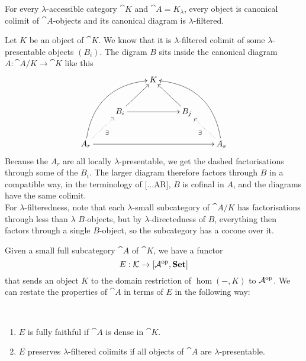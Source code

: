 \begin{Proposition}\label{prop:presdense}
For every $\lambda$-accessible category $\cat K$ and $\cat A = K_\lambda$, every object is canonical colimit of $\cat A$-objects and its canonical diagram is $\lambda$-filtered.
\end{Proposition}
\begin{Proof}
Let $K$ be an object of $\cat K$. We know that it is $\lambda$-filtered colimit of some $\lambda$-presentable objects $(B_i)$. The digram $B$ sits inside the canonical diagram $A : \cat A/K \to \cat K$ like this
\[
\xymatrix{
  & & K & & \\
& B_i \ar[rr] \ar[ru] & & B_j \ar[lu] & \\
A_r \ar[rrrr] \ar@/^2pc/[rruu] \ar@{.>}[ru]_{\exists} & & & & A_s \ar@{.>}[lu]^{\exists} \ar@/_2pc/[lluu]
}\]
Because the $A_r$ are all locally $\lambda$-presentable, we get the dashed factorisations through some of the $B_i$. The larger diagram therefore factors through $B$ in a compatible way, in the terminology of [...AR], $B$ is cofinal in $A$, and the diagrams have the same colimit. \\

For $\lambda$-filteredness, note that each $\lambda$-small subcategory of $\cat A/K$ has factorisations through less than $\lambda$ $B$-objects, but by $\lambda$-directedness of $B$, everything then factors through a single $B$-object, so the subcategory has a cocone over it. 
\end{Proof}


Given a small full subcategory $\cat A$ of $\cat K$, we have a functor 
\[ E : \mathcal{K} \to [\mathcal{A}^{\textrm{op}},\mathbf{Set}] \]
that sends an object $K$ to the domain restriction of $\hom(-, K)$ to $\mathcal{A}^{\textrm{op}}$. We can restate the properties of $\cat A$ in terms of $E$ in the following way:

\begin{Proposition}\
\label{prop:canonicalproperties}
\begin{enumerate}
\item $E$ is fully faithful if $\cat A$ is dense in $\cat K$. \label{item:fullyfaithful}
\item $E$ preserves $\lambda$-filtered colimits if all objects of $\cat A$ are $\lambda$-presentable. \label{item:limits}
\end{enumerate}
\end{Proposition}

